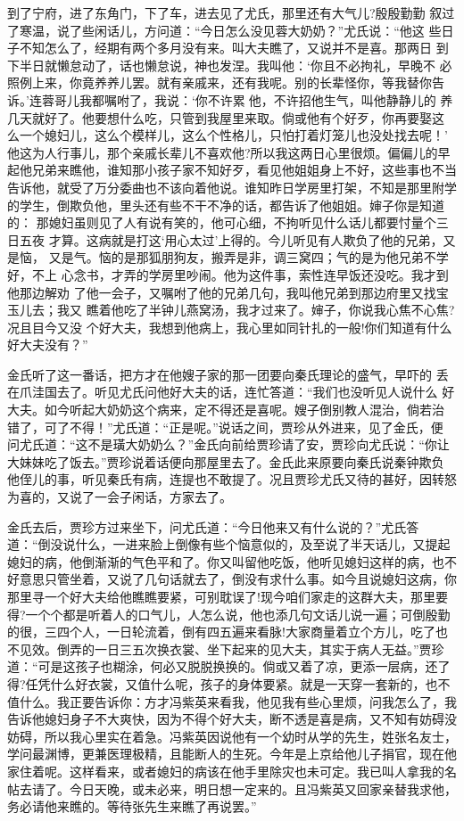 到了宁府，进了东角门，下了车，进去见了尤氏，那里还有大气儿?殷殷勤勤
叙过了寒温，说了些闲话儿，方问道：“今日怎么没见蓉大奶奶？”尤氏说：“他这
些日子不知怎么了，经期有两个多月没有来。叫大夫瞧了，又说并不是喜。那两日
到下半日就懒怠动了，话也懒怠说，神也发涅。我叫他：‘你且不必拘礼，早晚不
必照例上来，你竟养养儿罢。就有亲戚来，还有我呢。别的长辈怪你，等我替你告
诉。’连蓉哥儿我都嘱咐了，我说：‘你不许累他，不许招他生气，叫他静静儿的
养几天就好了。他要想什么吃，只管到我屋里来取。倘或他有个好歹，你再要娶这
么一个媳妇儿，这么个模样儿，这么个性格儿，只怕打着灯笼儿也没处找去呢！’
他这为人行事儿，那个亲戚长辈儿不喜欢他?所以我这两日心里很烦。偏偏儿的早
起他兄弟来瞧他，谁知那小孩子家不知好歹，看见他姐姐身上不好，这些事也不当
告诉他，就受了万分委曲也不该向着他说。谁知昨日学房里打架，不知是那里附学
的学生，倒欺负他，里头还有些不干不净的话，都告诉了他姐姐。婶子你是知道的：
那媳妇虽则见了人有说有笑的，他可心细，不拘听见什么话儿都要忖量个三日五夜
才算。这病就是打这‘用心太过’上得的。今儿听见有人欺负了他的兄弟，又是恼，
又是气。恼的是那狐朋狗友，搬弄是非，调三窝四；气的是为他兄弟不学好，不上
心念书，才弄的学房里吵闹。他为这件事，索性连早饭还没吃。我才到他那边解劝
了他一会子，又嘱咐了他的兄弟几句，我叫他兄弟到那边府里又找宝玉儿去；我又
瞧着他吃了半钟儿燕窝汤，我才过来了。婶子，你说我心焦不心焦?况且目今又没
个好大夫，我想到他病上，我心里如同针扎的一般!你们知道有什么好大夫没有？”

金氏听了这一番话，把方才在他嫂子家的那一团要向秦氏理论的盛气，早吓的
丢在爪洼国去了。听见尤氏问他好大夫的话，连忙答道：“我们也没听见人说什么
好大夫。如今听起大奶奶这个病来，定不得还是喜呢。嫂子倒别教人混治，倘若治
错了，可了不得！”尤氏道：“正是呢。”说话之间，贾珍从外进来，见了金氏，便
问尤氏道：“这不是璜大奶奶么？”金氏向前给贾珍请了安，贾珍向尤氏说：“你让
大妹妹吃了饭去。”贾珍说着话便向那屋里去了。金氏此来原要向秦氏说秦钟欺负
他侄儿的事，听见秦氏有病，连提也不敢提了。况且贾珍尤氏又待的甚好，因转怒
为喜的，又说了一会子闲话，方家去了。

金氏去后，贾珍方过来坐下，问尤氏道：“今日他来又有什么说的？”尤氏答
道：“倒没说什么，一进来脸上倒像有些个恼意似的，及至说了半天话儿，又提起
媳妇的病，他倒渐渐的气色平和了。你又叫留他吃饭，他听见媳妇这样的病，也不
好意思只管坐着，又说了几句话就去了，倒没有求什么事。如今且说媳妇这病，你
那里寻一个好大夫给他瞧瞧要紧，可别耽误了!现今咱们家走的这群大夫，那里要
得?一个个都是听着人的口气儿，人怎么说，他也添几句文话儿说一遍；可倒殷勤
的很，三四个人，一日轮流着，倒有四五遍来看脉!大家商量着立个方儿，吃了也
不见效。倒弄的一日三五次换衣裳、坐下起来的见大夫，其实于病人无益。”贾珍
道：“可是这孩子也糊涂，何必又脱脱换换的。倘或又着了凉，更添一层病，还了
得?任凭什么好衣裳，又值什么呢，孩子的身体要紧。就是一天穿一套新的，也不
值什么。我正要告诉你：方才冯紫英来看我，他见我有些心里烦，问我怎么了，我
告诉他媳妇身子不大爽快，因为不得个好大夫，断不透是喜是病，又不知有妨碍没
妨碍，所以我心里实在着急。冯紫英因说他有一个幼时从学的先生，姓张名友士，
学问最渊博，更兼医理极精，且能断人的生死。今年是上京给他儿子捐官，现在他
家住着呢。这样看来，或者媳妇的病该在他手里除灾也未可定。我已叫人拿我的名
帖去请了。今日天晚，或未必来，明日想一定来的。且冯紫英又回家亲替我求他，
务必请他来瞧的。等待张先生来瞧了再说罢。”

